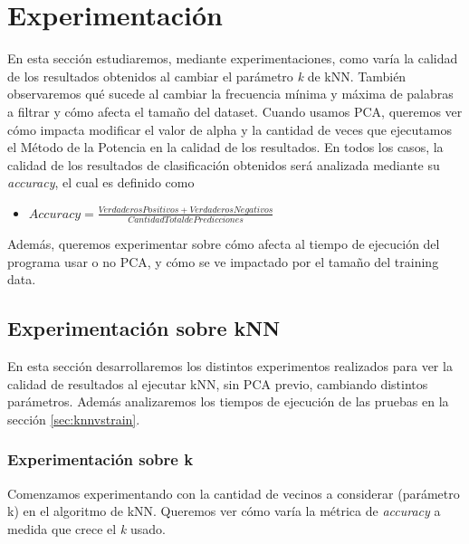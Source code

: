 \section{Experimentación}
En esta sección estudiaremos, mediante experimentaciones,
como varía la calidad de los resultados obtenidos al cambiar el parámetro\textit{ k }de kNN.
También observaremos qué sucede al cambiar la frecuencia mínima y máxima de palabras a filtrar
y cómo afecta el tamaño del dataset.
Cuando usamos PCA, queremos ver cómo impacta modificar el valor de alpha
y la cantidad de veces que ejecutamos el Método de la Potencia en la calidad de los resultados.
En todos los casos, la calidad de los resultados de clasificación obtenidos
será analizada mediante su \textit{accuracy}, el cual es definido como

\begin{itemize}
	\item $ \textit{Accuracy} = \frac{Verdaderos Positivos + Verdaderos Negativos}{Cantidad Total de Predicciones} $
\end{itemize}

Además, queremos experimentar sobre cómo afecta al tiempo de ejecución del programa usar o no PCA,
y cómo se ve impactado por el tamaño del training data.

\subsection{Experimentación sobre kNN}
En esta sección desarrollaremos los distintos experimentos realizados para ver
la calidad de resultados al ejecutar kNN, sin PCA previo, cambiando distintos
parámetros. Además analizaremos los tiempos de ejecución de las pruebas en la sección \ref{sec:knnvstrain}.

\subsubsection{Experimentación sobre k}
Comenzamos experimentando con la cantidad de vecinos a considerar (parámetro k)
en el algoritmo de kNN.
Queremos ver cómo varía la métrica de \textit{accuracy} a medida que crece el\textit{ k }usado.


